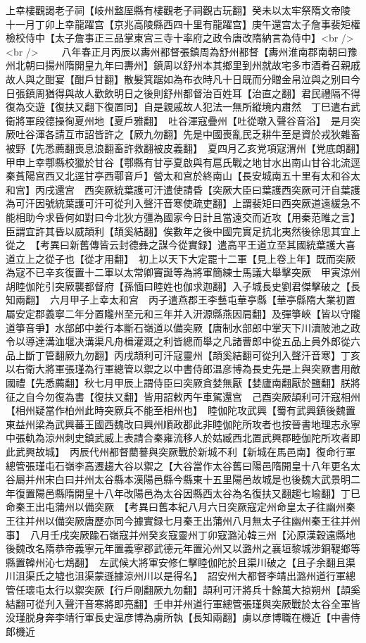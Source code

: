 上幸樓觀謁老子祠【岐州盩厔縣有樓觀老子祠觀古玩翻】癸未以太牢祭隋文帝陵　十一月丁卯上幸龍躍宫【京兆高陵縣西四十里有龍躍宫】庚午還宫太子詹事裴矩權檢校侍中【太子詹事正三品掌東宫三寺十率府之政令唐改隋納言為侍中】<br />
<br />
　　八年春正月丙辰以夀州都督張鎮周為舒州都督【夀州淮南郡南朝曰豫州北朝曰揚州隋開皇九年曰夀州】鎮周以舒州本其鄉里到州就故宅多市酒肴召親戚故人與之酣宴【酣戶甘翻】散髮箕踞如為布衣時凡十日既而分贈金帛泣與之别曰今日張鎮周猶得與故人歡飲明日之後則舒州都督治百姓耳【治直之翻】君民禮隔不得復為交遊【復扶又翻下復置同】自是親戚故人犯法一無所縱境内肅然　丁巳遣右武衛將軍段德操徇夏州地【夏戶雅翻】　吐谷渾寇疊州【吐從暾入聲谷音浴】　是月突厥吐谷渾各請互市詔皆許之【厥九勿翻】先是中國喪亂民乏耕牛至是資於戎狄雜畜被野【先悉薦翻喪息浪翻畜許救翻被皮義翻】　夏四月乙亥党項寇渭州【党底朗翻】　甲申上幸鄠縣校獵於甘谷【鄠縣有甘亭夏啟與有扈氏戰之地甘水出南山甘谷北流逕秦萯陽宫西又北逕甘亭西鄠音戶】營太和宫於終南山【長安城南五十里有太和谷太和宫】丙戌還宫　西突厥統葉護可汗遣使請昏【突厥大臣曰葉護西突厥可汗自葉護為可汗因號統葉護可汗可從刋入聲汗音寒使疏吏翻】上謂裴矩曰西突厥道遠緩急不能相助今求昏何如對曰今北狄方彊為國家今日計且當遠交而近攻【用秦范睢之言】臣謂宜許其昏以威頡利【頡奚結翻】俟數年之後中國完實足抗北夷然後徐思其宜上從之　【考異曰新舊傳皆云封德彝之謀今從實録】遣高平王道立至其國統葉護大喜道立上之從子也【從才用翻】　初上以天下大定罷十二軍【見上卷上年】既而突厥為寇不已辛亥復置十二軍以太常卿竇誕等為將軍簡練士馬議大舉擊突厥　甲寅涼州胡睦伽陀引突厥襲都督府【孫愐曰睦姓也伽求迦翻】入子城長史劉君傑擊破之【長知兩翻】　六月甲子上幸太和宫　丙子遣燕郡王李藝屯華亭縣【華亭縣隋大業初置屬安定郡義寧二年分置隴州至元和三年并入汧源縣燕因肩翻】及彈箏峽【皆以守隴道箏音爭】水部郎中姜行本斷石嶺道以備突厥【唐制水部郎中掌天下川瀆陂池之政令以導達溝洫堰决溝渠凡舟楫灌溉之利皆總而舉之凡諸曹郎中從五品上員外郎從六品上斷丁管翻厥九勿翻】丙戌頡利可汗寇靈州【頡奚結翻可從刋入聲汗音寒】丁亥以右衛大將軍張瑾為行軍總管以禦之以中書侍郎温彦博為長史先是上與突厥書用敵國禮【先悉薦翻】秋七月甲辰上謂侍臣曰突厥貪婪無厭【婪廬南翻厭於鹽翻】朕將征之自今勿復為書【復扶又翻】皆用詔敕丙午車駕還宫　己酉突厥頡利可汗寇相州【相州疑當作柏州此時突厥兵不能至相州也】　睦伽陀攻武興【蜀有武興鎮後魏置東益州梁為武興蕃王國西魏改曰興州順政郡此非睦伽陀所攻者也按晉書地理志永寧中張軌為涼州刺史鎮武威上表請合秦雍流移人於姑臧西北置武興郡睦伽陀所攻者即此武興故城】　丙辰代州都督藺謩與突厥戰於新城不利【新城在馬邑南】復命行軍總管張瑾屯石嶺李高遷趨大谷以禦之【大谷當作太谷舊曰陽邑隋開皇十八年更名太谷屬并州宋白曰并州太谷縣本漢陽邑縣今縣東十五里陽邑故城是也後魏大武景明二年復置陽邑縣隋開皇十八年改陽邑為太谷因縣西太谷為名復扶又翻趨七喻翻】丁巳命秦王出屯蒲州以備突厥　【考異曰舊本紀八月六日突厥寇定州命皇太子往幽州秦王往并州以備突厥唐歷亦同今據實録七月秦王出蒲州八月無太子往幽州秦王往并州事】　八月壬戌突厥踰石嶺寇并州癸亥寇靈州丁卯寇潞沁韓三州【沁原漢穀遠縣地後魏改名隋恭帝義寧元年置義寧郡武德元年置沁州又以潞州之襄垣黎城涉銅鞮鄉等縣置韓州沁七鴆翻】　左武候大將軍安修仁擊睦伽陀於且渠川破之【且子余翻且渠川沮渠氏之墟也沮渠蒙遜據涼州川以是得名】　詔安州大都督李靖出潞州道行軍總管任瓌屯太行以禦突厥【行戶剛翻厥九勿翻】頡利可汗將兵十餘萬大掠朔州【頡奚結翻可從刋入聲汗音寒將即亮翻】壬申并州道行軍總管張瑾與突厥戰於太谷全軍皆没瑾脱身奔李靖行軍長史温彦博為虜所執【長知兩翻】虜以彦博職在機近【中書侍郎機近